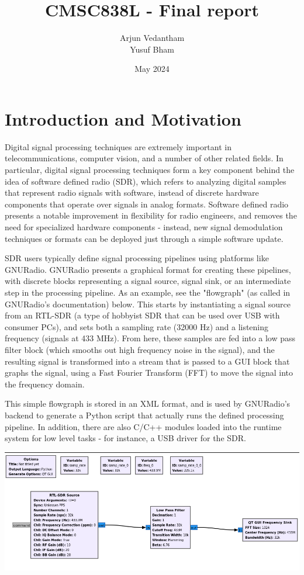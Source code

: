 \documentclass[12pt]{article}
\title{CMSC838L - Final report}
\author{Arjun Vedantham \\ Yusuf Bham}
\date{May 2024}
\begin{document}
\maketitle

\section{Introduction and Motivation}
Digital signal processing techniques are extremely important in telecommunications, computer vision, and a number of other related fields.
In particular, digital signal processing techniques form a key component behind the idea of software defined radio (SDR),
which refers to analyzing digital samples that represent radio signals with software, instead of discrete hardware components that operate
over signals in analog formats. Software defined radio presents a notable improvement in flexibility for radio engineers, and removes the
need for specialized hardware components - instead, new signal demodulation techniques or formats can be deployed just through a simple software
update.

SDR users typically define signal processing pipelines using platforms like GNURadio. GNURadio presents a graphical format for creating these
pipelines, with discrete blocks representing a signal source, signal sink, or an intermediate step in the processing pipeline. As an example,
see the "flowgraph" (as called in GNURadio's documentation) below. This starts by instantiating a signal source from an RTL-SDR (a type of hobbyist SDR that can be used
over USB with consumer PCs), and sets both a sampling rate (32000 Hz) and a listening frequency (signals at 433 MHz). From here, these samples
are fed into a low pass filter block (which smooths out high frequency noise in the signal), and the resulting signal is transformed into
a stream that is passed to a GUI block that graphs the signal, using a Fast Fourier Transform (FFT) to move the signal into the frequency domain.

This simple flowgraph is stored in an XML format, and is used by GNURadio's backend to generate a Python script that actually runs the defined
processing pipeline. In addition, there are also C/C++ modules loaded into the runtime system for low level tasks - for instance, a USB driver for the SDR.

\includegraphics[width=\linewidth]{images/gnuradio.png}
\end{document}
